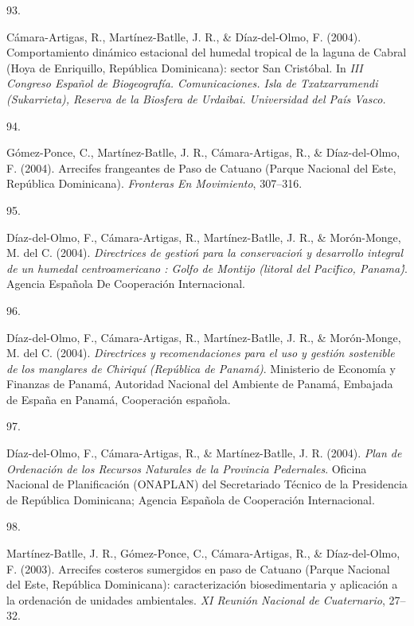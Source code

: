 \documentclass[10pt,a4paper,]{article}
\newlength{\cslhangindent}
\newlength{\csllabelwidth}
\newcommand{\CSLLeftMargin}[1]{\parbox[t]{\csllabelwidth}{\hfill #1~}}
\newcommand{\CSLRightInline}[1]{\parbox[t]{\linewidth - \cslhangindent - \csllabelwidth}{#1}\vspace{0.8ex}}
\begin{document}
\leavevmode\hypertarget{ref-Jose_Ramon_Martinez-Batlle_108102924}{}%
\CSLLeftMargin{93. }
\CSLRightInline{Cámara-Artigas, R., Martínez-Batlle, J. R., \&
Díaz-del-Olmo, F. (2004). Comportamiento dinámico estacional del humedal
tropical de la laguna de Cabral (Hoya de Enriquillo, República
Dominicana): sector San Cristóbal. In \emph{III Congreso Español de
Biogeografía. Comunicaciones. Isla de Txatxarramendi (Sukarrieta),
Reserva de la Biosfera de Urdaibai. Universidad del País Vasco.}}

\leavevmode\hypertarget{ref-batlle2004arrecifes}{}%
\CSLLeftMargin{94. }
\CSLRightInline{Gómez-Ponce, C., Martínez-Batlle, J. R., Cámara-Artigas,
R., \& Díaz-del-Olmo, F. (2004). Arrecifes frangeantes de Paso de
Catuano (Parque Nacional del Este, República Dominicana).
\emph{Fronteras En Movimiento}, 307--316.}

\leavevmode\hypertarget{ref-Jose_Ramon_Martinez-Batlle_108001058}{}%
\CSLLeftMargin{95. }
\CSLRightInline{Díaz-del-Olmo, F., Cámara-Artigas, R., Martínez-Batlle,
J. R., \& Morón-Monge, M. del C. (2004). \emph{Directrices de gestioń
para la conservacioń y desarrollo integral de un humedal centroamericano
: Golfo de Montijo (litoral del Pacif́ico, Panama)́}. Agencia Española De
Cooperación Internacional.}

\leavevmode\hypertarget{ref-2004Dyrp}{}%
\CSLLeftMargin{96. }
\CSLRightInline{Díaz-del-Olmo, F., Cámara-Artigas, R., Martínez-Batlle,
J. R., \& Morón-Monge, M. del C. (2004). \emph{Directrices y
recomendaciones para el uso y gestión sostenible de los manglares de
Chiriquí (República de Panamá)}. Ministerio de Economía y Finanzas de
Panamá, Autoridad Nacional del Ambiente de Panamá, Embajada de España en
Panamá, Cooperación española.}

\leavevmode\hypertarget{ref-Jose_Ramon_Martinez-Batlle_108002351}{}%
\CSLLeftMargin{97. }
\CSLRightInline{Díaz-del-Olmo, F., Cámara-Artigas, R., \&
Martínez-Batlle, J. R. (2004). \emph{Plan de Ordenación de los Recursos
Naturales de la Provincia Pedernales}. Oficina Nacional de Planificación
(ONAPLAN) del Secretariado Técnico de la Presidencia de República
Dominicana; Agencia Española de Cooperación Internacional.}

\leavevmode\hypertarget{ref-martinez2003arrecifes}{}%
\CSLLeftMargin{98. }
\CSLRightInline{Martínez-Batlle, J. R., Gómez-Ponce, C., Cámara-Artigas,
R., \& Díaz-del-Olmo, F. (2003). Arrecifes costeros sumergidos en paso
de Catuano (Parque Nacional del Este, República Dominicana):
caracterización biosedimentaria y aplicación a la ordenación de unidades
ambientales. \emph{XI Reunión Nacional de Cuaternario}, 27--32.}
\end{document}
